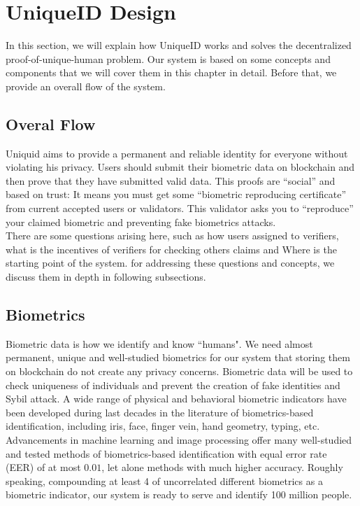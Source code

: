 \documentclass[conference]{IEEEtran}
\begin{document}
\section{UniqueID Design}
In this section, we will explain how UniqueID works and solves the decentralized proof-of-unique-human problem. Our system is based on some concepts and components that we will cover them in this chapter in detail. Before that, we provide an overall flow of the system.

\subsection{Overal Flow}

Uniquid aims to provide a permanent and reliable identity for everyone without violating his privacy.  Users should submit their biometric data on blockchain and then prove that they have submitted valid data. This proofs are “social” and based on trust: It means you must get some “biometric reproducing certificate” from current accepted users or validators. This validator asks you to “reproduce” your claimed biometric and preventing fake biometrics attacks.
\\
There are some questions arising here, such as how users assigned to verifiers, what is the incentives of verifiers for checking others claims and Where is the starting point of the system. for addressing these questions and concepts, we discuss them in depth in following subsections.
\subsection{Biometrics}
Biometric data is how we identify and know ``humans". We need almost permanent, unique and well-studied biometrics for our system that storing them on blockchain do not create any privacy concerns. 
Biometric data will be used to check uniqueness of individuals and prevent the creation of fake identities and Sybil attack. A wide range of physical and behavioral biometric indicators have been developed during last decades in the literature of biometrics-based identification, including iris, face, finger vein, hand geometry, typing, etc. Advancements in machine learning and image processing offer many well-studied and tested methods of biometrics-based identification with equal error rate (EER) of at most $0.01$, let alone methods with much higher accuracy. Roughly speaking, compounding at least 4 of uncorrelated different biometrics as a biometric indicator, our system is ready to serve and identify 100 million people.\\
\end{document}
